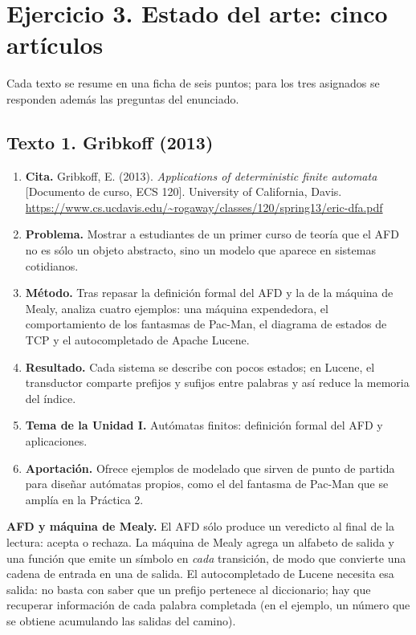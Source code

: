 \hypertarget{ejercicio-3.-estado-del-arte-cinco-artuxedculos}{%
\section{Ejercicio 3. Estado del arte: cinco artículos}\label{ejercicio-3.-estado-del-arte-cinco-artuxedculos}}

Cada texto se resume en una ficha de seis puntos; para los tres asignados se responden además las preguntas del enunciado.

\hypertarget{texto-1.-gribkoff-2013}{%
\subsection{Texto 1. Gribkoff (2013)}\label{texto-1.-gribkoff-2013}}

\begin{enumerate}
\def\labelenumi{\arabic{enumi}.}
\tightlist
\item
  \textbf{Cita.} Gribkoff, E. (2013). \emph{Applications of deterministic finite automata} {[}Documento de curso, ECS 120{]}. University of California, Davis. \url{https://www.cs.ucdavis.edu/~rogaway/classes/120/spring13/eric-dfa.pdf}
\item
  \textbf{Problema.} Mostrar a estudiantes de un primer curso de teoría que el AFD no es sólo un objeto abstracto, sino un modelo que aparece en sistemas cotidianos.
\item
  \textbf{Método.} Tras repasar la definición formal del AFD y la de la máquina de Mealy, analiza cuatro ejemplos: una máquina expendedora, el comportamiento de los fantasmas de Pac-Man, el diagrama de estados de TCP y el autocompletado de Apache Lucene.
\item
  \textbf{Resultado.} Cada sistema se describe con pocos estados; en Lucene, el transductor comparte prefijos y sufijos entre palabras y así reduce la memoria del índice.
\item
  \textbf{Tema de la Unidad I.} Autómatas finitos: definición formal del AFD y aplicaciones.
\item
  \textbf{Aportación.} Ofrece ejemplos de modelado que sirven de punto de partida para diseñar autómatas propios, como el del fantasma de Pac-Man que se amplía en la Práctica 2.
\end{enumerate}

\textbf{AFD y máquina de Mealy.} El AFD sólo produce un veredicto al final de la lectura: acepta o rechaza. La máquina de Mealy agrega un alfabeto de salida y una función que emite un símbolo en \emph{cada} transición, de modo que convierte una cadena de entrada en una de salida. El autocompletado de Lucene necesita esa salida: no basta con saber que un prefijo pertenece al diccionario; hay que recuperar información de cada palabra completada (en el ejemplo, un número que se obtiene acumulando las salidas del camino).


